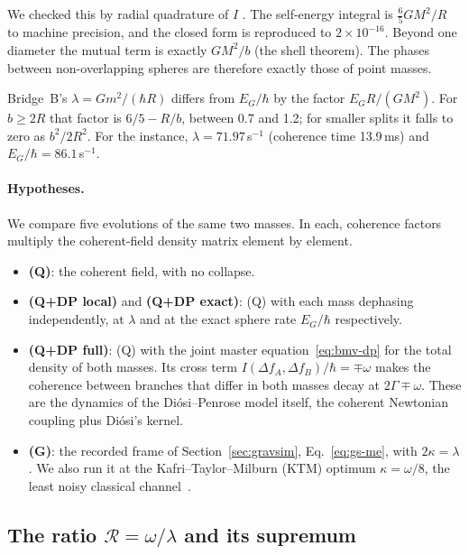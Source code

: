 We checked this by radial quadrature of $I$ . The self-energy integral is $\tfrac65GM^2/R$ to machine precision, and the
closed form is reproduced to $2\times10^{-16}$. Beyond one diameter the mutual term is exactly $GM^2/b$ (the shell theorem). The phases
between non-overlapping spheres are therefore exactly those of point masses.

Bridge~B's $\lambda=Gm^2/(\hbar R)$ differs from $E_G/\hbar$ by the factor $E_GR/(GM^2)$. For $b\ge2R$ that factor is $6/5-R/b$, between 0.7
and 1.2; for smaller splits it falls to zero as $b^2/2R^2$. For the instance, $\lambda=71.97$\,s$^{-1}$ (coherence time 13.9\,ms) and
$E_G/\hbar=86.1$\,s$^{-1}$.

\paragraph{Hypotheses.} We compare five evolutions of the same two masses. In each, coherence factors multiply the coherent-field density
matrix element by element.
\begin{itemize}[nosep]
\item \textbf{(Q)}: the coherent field, with no collapse.
\item \textbf{(Q+DP local)} and \textbf{(Q+DP exact)}: (Q) with each mass dephasing independently, at $\lambda$ and at the exact sphere rate
$E_G/\hbar$ respectively.
\item \textbf{(Q+DP full)}: (Q) with the joint master equation~\eqref{eq:bmv-dp} for the total density of both masses. Its cross term
$I(\Delta f_A,\Delta f_B)/\hbar=\mp\omega$ makes the coherence between branches that differ in both masses decay at $2\Gamma\mp\omega$. These
are the dynamics of the Di\'osi--Penrose model itself, the coherent Newtonian coupling plus Di\'osi's kernel.
\item \textbf{(G)}: the recorded frame of Section~\ref{sec:gravsim}, Eq.~\eqref{eq:gs-me}, with $2\kappa=\lambda$. We also run it at the
Kafri--Taylor--Milburn (KTM) optimum $\kappa=\omega/8$, the least noisy classical channel~\cite{ktm}.
\end{itemize}

\subsection{The ratio \texorpdfstring{$\mathcal R=\omega/\lambda$}{R = omega/lambda} and its supremum}\label{ss:bmv-rho}

